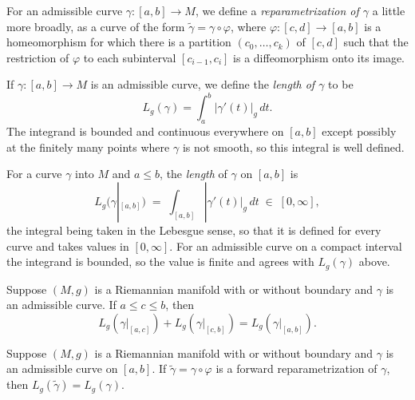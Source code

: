 For an admissible curve $\gamma: [a,b] \to M$, we define a \emph{reparametrization of $\gamma$} a little more broadly, as a curve of the form $\tilde{\gamma} = \gamma \circ \varphi$, where $\varphi: [c,d] \to [a,b]$ is a homeomorphism for which there is a partition $(c_0,\ldots,c_k)$ of $[c,d]$ such that the restriction of $\varphi$ to each subinterval $[c_{i-1},c_i]$ is a diffeomorphism onto its image.

If $\gamma: [a,b] \to M$ is an admissible curve, we define the \emph{length of $\gamma$} to be
\[
L_g(\gamma) = \int_a^b |\gamma'(t)|_g \, dt.
\]
The integrand is bounded and continuous everywhere on $[a,b]$ except possibly at the finitely many points where $\gamma$ is not smooth, so this integral is well defined.

\begin{definition}
\label{def:length-of-curve}
\mathlibok
{}
For a curve $\gamma$ into $M$ and $a \le b$, the \emph{length} of $\gamma$ on $[a,b]$ is
\[
  L_g(\gamma|_{[a,b]}) \;=\; \int_{[a,b]} |\gamma'(t)|_g \, dt \;\in\; [0,\infty],
\]
the integral being taken in the Lebesgue sense, so that it is defined for every curve and takes values in $[0,\infty]$. For an admissible curve on a compact interval the integrand is bounded, so the value is finite and agrees with $L_g(\gamma)$ above.
\end{definition}

\begin{proposition}
\label{prop:length-additive}
\mathlibok
{}
Suppose $(M,g)$ is a Riemannian manifold with or without boundary and $\gamma$ is an admissible curve. If $a \le c \le b$, then
\[
  L_g(\gamma|_{[a,c]}) + L_g(\gamma|_{[c,b]}) = L_g(\gamma|_{[a,b]}).
\]
\end{proposition}

\begin{proposition}
\label{prop:length-reparam-invariant}
\mathlibok
{}
Suppose $(M,g)$ is a Riemannian manifold with or without boundary and $\gamma$ is an admissible curve on $[a,b]$. If $\tilde{\gamma} = \gamma \circ \varphi$ is a forward reparametrization of $\gamma$, then $L_g(\tilde{\gamma}) = L_g(\gamma)$.
\end{proposition}

